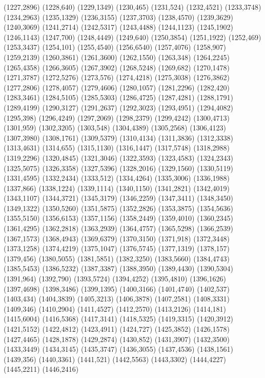 (1227,2896)
(1228,640)
(1229,1349)
(1230,465)
(1231,524)
(1232,4521)
(1233,3748)
(1234,2963)
(1235,1329)
(1236,3155)
(1237,3703)
(1238,4570)
(1239,3629)
(1240,3069)
(1241,2714)
(1242,5317)
(1243,4488)
(1244,1123)
(1245,1902)
(1246,1143)
(1247,700)
(1248,4449)
(1249,640)
(1250,3854)
(1251,1922)
(1252,469)
(1253,3437)
(1254,101)
(1255,4540)
(1256,6540)
(1257,4076)
(1258,907)
(1259,2139)
(1260,3861)
(1261,3600)
(1262,1550)
(1263,348)
(1264,2245)
(1265,4358)
(1266,3605)
(1267,3902)
(1268,5248)
(1269,682)
(1270,1478)
(1271,3787)
(1272,5276)
(1273,576)
(1274,4218)
(1275,3038)
(1276,3862)
(1277,2806)
(1278,4057)
(1279,4606)
(1280,1057)
(1281,2296)
(1282,420)
(1283,3461)
(1284,5105)
(1285,5303)
(1286,4725)
(1287,4281)
(1288,1791)
(1289,4199)
(1290,3127)
(1291,2637)
(1292,3023)
(1293,4951)
(1294,4082)
(1295,398)
(1296,4249)
(1297,2069)
(1298,2379)
(1299,4242)
(1300,4713)
(1301,959)
(1302,3205)
(1303,548)
(1304,4389)
(1305,2568)
(1306,4123)
(1307,3980)
(1308,1761)
(1309,5379)
(1310,4134)
(1311,3836)
(1312,3338)
(1313,4631)
(1314,655)
(1315,1130)
(1316,1447)
(1317,5748)
(1318,2988)
(1319,2296)
(1320,4845)
(1321,3046)
(1322,3593)
(1323,4583)
(1324,2343)
(1325,5075)
(1326,3358)
(1327,5396)
(1328,2016)
(1329,1560)
(1330,5119)
(1331,4595)
(1332,2434)
(1333,512)
(1334,4264)
(1335,3006)
(1336,1988)
(1337,866)
(1338,1224)
(1339,1114)
(1340,1150)
(1341,2821)
(1342,4019)
(1343,1107)
(1344,3721)
(1345,3179)
(1346,2259)
(1347,3411)
(1348,3450)
(1349,1322)
(1350,5260)
(1351,5875)
(1352,2826)
(1353,3875)
(1354,5636)
(1355,5150)
(1356,6153)
(1357,1156)
(1358,2449)
(1359,4010)
(1360,2345)
(1361,4295)
(1362,2818)
(1363,2939)
(1364,4757)
(1365,5298)
(1366,2539)
(1367,1573)
(1368,4943)
(1369,6379)
(1370,3150)
(1371,918)
(1372,3448)
(1373,1258)
(1374,4219)
(1375,1047)
(1376,5745)
(1377,1319)
(1378,157)
(1379,456)
(1380,5055)
(1381,5851)
(1382,3250)
(1383,5660)
(1384,4743)
(1385,5453)
(1386,5232)
(1387,3387)
(1388,3950)
(1389,4430)
(1390,5304)
(1391,964)
(1392,790)
(1393,5724)
(1394,4252)
(1395,4810)
(1396,1626)
(1397,4698)
(1398,3486)
(1399,1395)
(1400,3166)
(1401,4740)
(1402,537)
(1403,434)
(1404,3839)
(1405,3213)
(1406,3878)
(1407,2581)
(1408,3331)
(1409,346)
(1410,2904)
(1411,4527)
(1412,2570)
(1413,2126)
(1414,181)
(1415,6004)
(1416,5368)
(1417,3141)
(1418,5325)
(1419,3315)
(1420,3912)
(1421,5152)
(1422,4812)
(1423,4911)
(1424,727)
(1425,3852)
(1426,1578)
(1427,4465)
(1428,1878)
(1429,2874)
(1430,852)
(1431,3907)
(1432,3500)
(1433,3449)
(1434,3145)
(1435,3747)
(1436,3055)
(1437,4536)
(1438,1561)
(1439,356)
(1440,3361)
(1441,521)
(1442,5563)
(1443,3302)
(1444,4227)
(1445,2211)
(1446,2416)

